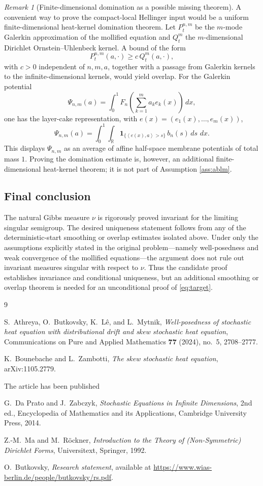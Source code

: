 \documentclass[12pt]{article}
\newcommand{\R}{\mathbb R}
\newcommand{\1}{\mathbf 1}
\newcommand{\dd}{\,d}
\newcommand{\ip}[2]{\left\langle #1,#2\right\rangle}
\theoremstyle{plain}
\theoremstyle{definition}
\theoremstyle{remark}
\newtheorem{remark}[theorem]{Remark}
\numberwithin{equation}{section}
\newcommand{\review}[1]{\begin{reviewbox}#1\end{reviewbox}}
\begin{document}
\begin{remark}[Finite-dimensional domination as a possible missing theorem]
A convenient way to prove the compact-local Hellinger input would be a uniform
finite-dimensional heat-kernel domination theorem.  Let \(P_t^{n,m}\) be the
\(m\)-mode Galerkin approximation of the mollified equation and \(Q_t^m\) the
\(m\)-dimensional Dirichlet Ornstein--Uhlenbeck kernel.  A bound of the form
\[
P_t^{n,m}(a,\cdot)\ge c\,Q_t^m(a,\cdot),
\]
with \(c>0\) independent of \(n,m,a\), together with a passage from Galerkin
kernels to the infinite-dimensional kernels, would yield overlap.  For the
Galerkin potential
\[
\Psi_{n,m}(a)
=
\int_0^1F_n\!\left(\sum_{k=1}^ma_ke_k(x)\right)\dd x,
\]
one has the layer-cake representation, with
\(e(x)=(e_1(x),\ldots,e_m(x))\),
\[
\Psi_{n,m}(a)
=
\int_0^1\int_{\R}
\1_{\{\ip{e(x)}{a}>s\}}\,b_n(s)\dd s\,\dd x.
\]
This displays \(\Psi_{n,m}\) as an average of affine half-space membrane
potentials of total mass \(1\).  Proving the domination estimate is, however,
an additional finite-dimensional heat-kernel theorem; it is not part of
Assumption \ref{ass:ablm}.
\end{remark}

\subsection*{Final conclusion}

The natural Gibbs measure \(\nu\) is rigorously proved invariant for the
limiting singular semigroup.  The desired uniqueness statement follows from
any of the deterministic-start smoothing or overlap estimates isolated above.
Under only the assumptions explicitly stated in the original problem---namely
well-posedness and weak convergence of the mollified equations---the argument
does not rule out invariant measures singular with respect to \(\nu\).  Thus the
candidate proof establishes invariance and conditional uniqueness, but an
additional smoothing or overlap theorem is needed for an unconditional proof of
\eqref{eq:target}.

\begin{thebibliography}{9}

S.~Athreya, O.~Butkovsky, K.~L\^{e}, and L.~Mytnik,
\emph{Well-posedness of stochastic heat equation with distributional drift and
skew stochastic heat equation},
Communications on Pure and Applied Mathematics \textbf{77} (2024), no.~5,
2708--2777.

K.~Bounebache and L.~Zambotti,
\emph{The skew stochastic heat equation},
arXiv:1105.2779. \review{The article has been published}

G.~Da Prato and J.~Zabczyk,
\emph{Stochastic Equations in Infinite Dimensions},
2nd ed., Encyclopedia of Mathematics and its Applications, Cambridge
University Press, 2014.

Z.-M.~Ma and M.~R{\"o}ckner,
\emph{Introduction to the Theory of (Non-Symmetric) Dirichlet Forms},
Universitext, Springer, 1992.

O.~Butkovsky,
\emph{Research statement},
available at \url{https://www.wias-berlin.de/people/butkovsky/rs.pdf}.

\end{thebibliography}
\end{document}
